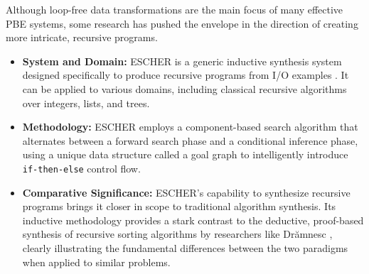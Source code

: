 \documentclass[12pt, a4paper]{report}
\begin{document}
Although loop-free data transformations are the main focus of many effective PBE systems, some research has pushed the envelope in the direction of creating more intricate, recursive programs.

\begin{itemize}
    \item \textbf{System and Domain:} ESCHER is a generic inductive synthesis system designed specifically to produce recursive programs from I/O examples \citep{albarghouthi2013escher}. It can be applied to various domains, including classical recursive algorithms over integers, lists, and trees.
    \item \textbf{Methodology:} ESCHER employs a component-based search algorithm that alternates between a forward search phase and a conditional inference phase, using a unique data structure called a goal graph to intelligently introduce \texttt{if-then-else} control flow.
    \item \textbf{Comparative Significance:} ESCHER's capability to synthesize recursive programs brings it closer in scope to traditional algorithm synthesis. Its inductive methodology provides a stark contrast to the deductive, proof-based synthesis of recursive sorting algorithms by researchers like Drămnesc \citep{dramnesc2005proof}, clearly illustrating the fundamental differences between the two paradigms when applied to similar problems.
\end{itemize}
\end{document}
